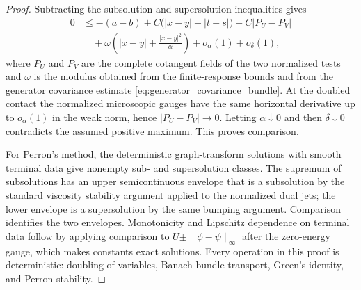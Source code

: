 \documentclass[12pt, letterpaper]{amsart}
\theoremstyle{plain}
\theoremstyle{definition}
\theoremstyle{remark}
\begin{document}
\begin{proof}
Subtracting the subsolution and supersolution inequalities gives
\begin{equation}
\begin{split}
    0&\le -(a-b)
       +C\big(|x-y|+|t-s|\big)
       +C\big|P_U-P_V\big| \\
      &\quad
       +\omega\!\left(|x-y|+\frac{|x-y|^2}{\alpha}\right)
       +o_\alpha(1)+o_\delta(1),
\end{split}
\end{equation}
where $P_U$ and $P_V$ are the complete cotangent fields of the two normalized
tests and $\omega$ is the modulus obtained from the finite-response bounds and
from the generator covariance estimate
\eqref{eq:generator_covariance_bundle}.  At the doubled contact the normalized
microscopic gauges have the same horizontal derivative up to
$o_\alpha(1)$ in the weak norm, hence $|P_U-P_V|\to0$.  Letting
$\alpha\downarrow0$ and then $\delta\downarrow0$ contradicts the assumed
positive maximum.  This proves comparison.

For Perron's method, the deterministic graph-transform solutions with smooth
terminal data give nonempty sub- and supersolution classes.  The supremum of
subsolutions has an upper semicontinuous envelope that is a subsolution by the
standard viscosity stability argument applied to the normalized dual jets; the
lower envelope is a supersolution by the same bumping argument.  Comparison
identifies the two envelopes.  Monotonicity and Lipschitz dependence on terminal
data follow by applying comparison to $U\pm\|\phi-\psi\|_\infty$ after the
zero-energy gauge, which makes constants exact solutions.  Every operation in
this proof is deterministic: doubling of variables, Banach-bundle transport,
Green's identity, and Perron stability.
\end{proof}
\end{document}
